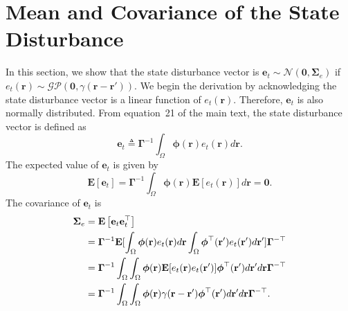 \documentclass[]{article}
\begin{document}
\section*{Mean and Covariance of the State Disturbance }\label{ColoredNoise} 
In this section, we show that the state disturbance vector is $\mathbf{e}_t\sim\mathcal{N}(\mathbf 0,\boldsymbol\Sigma_e)$ if $e_t(\mathbf{r})\sim\mathcal{GP}\left(\mathbf 0,\gamma(\mathbf{r}-\mathbf{r}')\right)$. We begin the derivation by acknowledging the state disturbance vector is a linear function of $e_t(\mathbf r)$. Therefore, $\mathbf{e}_t$ is also normally distributed. From equation~21 of the main text, the state disturbance vector is defined as
\begin{equation}
	\mathbf{e}_t \triangleq \boldsymbol{\Gamma}^{-1}\int_\Omega {\boldsymbol{\phi} ( \mathbf{r} )e_t( \mathbf{r} )d\mathbf{r}}.
\end{equation}
The expected value of $\mathbf e_t$ is given by 
\begin{equation}
	\mathbf E\left[ \mathbf e_t\right]= \mathbf{\Gamma}^{-1}\int_{\Omega}\boldsymbol\phi\left(\mathbf{r}\right)\mathbf E\left[e_t\left(\mathbf{r}\right)\right] d\mathbf{r}=\mathbf 0.
\end{equation}
The covariance of $\mathbf{e}_t$ is 
\begin{align}
	\boldsymbol\Sigma_e &=\lefteqn{\mathbf E\left[ \mathbf e_t\mathbf e_t^\top\right]} \nonumber \\ 
&=\mathbf{\Gamma}^{-1}\mathbf E[\int_{\Omega}\boldsymbol{\phi}(\mathbf{r})e_t(\mathbf{r})d\mathbf{r} \int_{\Omega}\boldsymbol{\phi}^{\top}(\mathbf{r}') e_t(\mathbf{r}')d\mathbf{r}']\mathbf{\Gamma}^{- \top} \nonumber \\
	&=\mathbf{\Gamma}^{-1}\int_{\Omega}\int_{\Omega} \boldsymbol{\phi}(\mathbf{r}) \mathbf E[e_t(\mathbf{r})e_t(\mathbf{r}')]\boldsymbol{\phi}^{\top}(\mathbf{r}')d\mathbf{r}' d\mathbf r\mathbf{\Gamma}^{- \top} \nonumber\\
	&=\mathbf{\Gamma}^{-1}\int_{\Omega}\int_{\Omega}\boldsymbol{\phi}(\mathbf r) \gamma(\mathbf r- \mathbf r' )\boldsymbol{\phi}^{\top}(\mathbf r')d\mathbf r' d\mathbf r\mathbf{\Gamma}^{-\top}.
\end{align}
\end{document}
